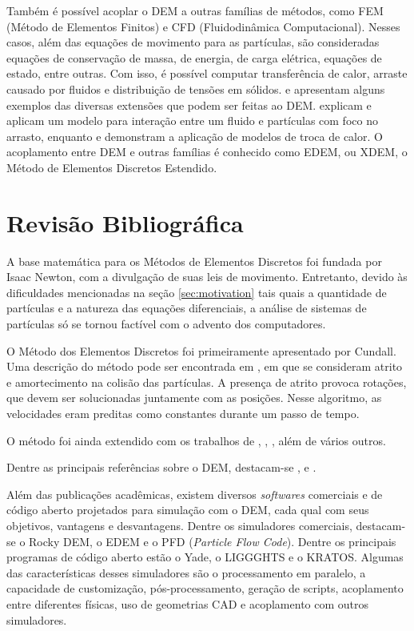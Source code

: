 Também é possível acoplar o DEM a outras famílias de métodos, como FEM (Método de Elementos Finitos) e CFD (Fluidodinâmica Computacional). Nesses casos, além das equações de movimento para as partículas, são consideradas equações de conservação de massa, de energia, de carga elétrica, equações de estado, entre outras. Com isso, é possível computar transferência de calor, arraste causado por fluidos e distribuição de tensões em sólidos.  e  apresentam alguns exemplos das diversas extensões que podem ser feitas ao DEM.  explicam e aplicam um modelo para interação entre um fluido e partículas com foco no arrasto, enquanto  e  demonstram a aplicação de modelos de troca de calor. O acoplamento entre DEM e outras famílias é conhecido como EDEM, ou XDEM, o Método de Elementos Discretos Estendido.

\section{Revisão Bibliográfica}

A base matemática para os Métodos de Elementos Discretos foi fundada por Isaac Newton, com a divulgação de suas leis de movimento. Entretanto, devido às dificuldades mencionadas na seção \ref{sec:motivation} tais quais a quantidade de partículas e a natureza das equações diferenciais, a análise de sistemas de partículas só se tornou factível com o advento dos computadores.

O Método dos Elementos Discretos foi primeiramente apresentado por Cundall. Uma descrição do método pode ser encontrada em , em que se consideram atrito e amortecimento na colisão das partículas. A presença de atrito provoca rotações, que devem ser solucionadas juntamente com as posições. Nesse algoritmo, as velocidades eram preditas como constantes durante um passo de tempo.

O método foi ainda extendido com os trabalhos de , , , além de vários outros.

Dentre as principais referências sobre o DEM, destacam-se ,  e .

Além das publicações acadêmicas, existem diversos \textit{softwares} comerciais e de código aberto projetados para simulação com o DEM, cada qual com seus objetivos, vantagens e desvantagens. Dentre os simuladores comerciais, destacam-se o Rocky DEM, o EDEM e o PFD (\textit{Particle Flow Code}). Dentre os principais programas de código aberto estão o Yade, o LIGGGHTS e o KRATOS. Algumas das características desses simuladores são o processamento em paralelo, a capacidade de customização, pós-processamento, geração de scripts, acoplamento entre diferentes físicas, uso de geometrias CAD e acoplamento com outros simuladores.

